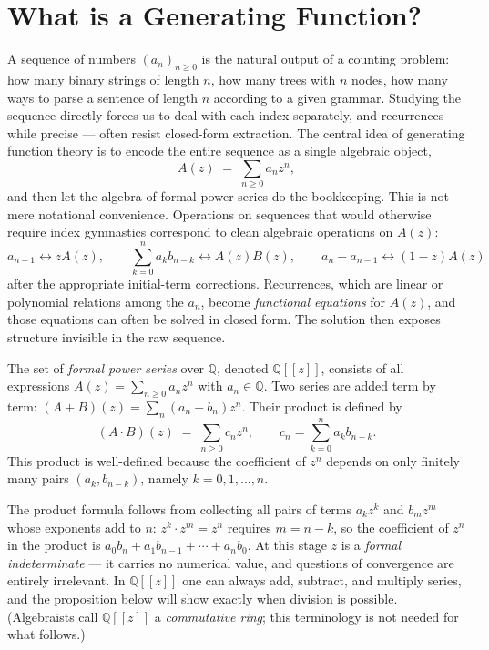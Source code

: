 \chapter{What is a Generating Function?}

A sequence of numbers $(a_n)_{n \ge 0}$ is the natural output of a counting problem: how many binary strings of length $n$, how many trees with $n$ nodes, how many ways to parse a sentence of length $n$ according to a given grammar. Studying the sequence directly forces us to deal with each index separately, and recurrences --- while precise --- often resist closed-form extraction. The central idea of generating function theory is to encode the entire sequence as a single algebraic object,
\[
  A(z) \;=\; \sum_{n \ge 0} a_n z^n,
\]
and then let the algebra of formal power series do the bookkeeping. This is not mere notational convenience. Operations on sequences that would otherwise require index gymnastics correspond to clean algebraic operations on $A(z)$:
\[
  a_{n-1} \longleftrightarrow zA(z), \qquad
  \sum_{k=0}^n a_k b_{n-k} \longleftrightarrow A(z)B(z), \qquad
  a_n-a_{n-1} \longleftrightarrow (1-z)A(z)
\]
after the appropriate initial-term corrections. Recurrences, which are linear or polynomial relations among the $a_n$, become \emph{functional equations} for $A(z)$, and those equations can often be solved in closed form. The solution then exposes structure invisible in the raw sequence.

\begin{definition}
The set of \emph{formal power series} over $\mathbb{Q}$, denoted $\mathbb{Q}[[z]]$, consists of all expressions $A(z) = \sum_{n \ge 0} a_n z^n$ with $a_n \in \mathbb{Q}$. Two series are added term by term: $(A+B)(z) = \sum_n (a_n + b_n) z^n$. Their product is defined by
\[
  (A \cdot B)(z) \;=\; \sum_{n \ge 0} c_n z^n, \qquad c_n = \sum_{k=0}^{n} a_k b_{n-k}.
\]
This product is well-defined because the coefficient of $z^n$ depends on only finitely many pairs $(a_k,b_{n-k})$, namely $k=0,1,\dots,n$.
\end{definition}

The product formula follows from collecting all pairs of terms $a_k z^k$ and $b_m z^m$ whose exponents add to $n$: $z^k \cdot z^m = z^n$ requires $m = n-k$, so the coefficient of $z^n$ in the product is $a_0 b_n + a_1 b_{n-1} + \cdots + a_n b_0$. At this stage $z$ is a \emph{formal indeterminate} --- it carries no numerical value, and questions of convergence are entirely irrelevant. In $\mathbb{Q}[[z]]$ one can always add, subtract, and multiply series, and the proposition below will show exactly when division is possible. (Algebraists call $\mathbb{Q}[[z]]$ a \emph{commutative ring}; this terminology is not needed for what follows.)

